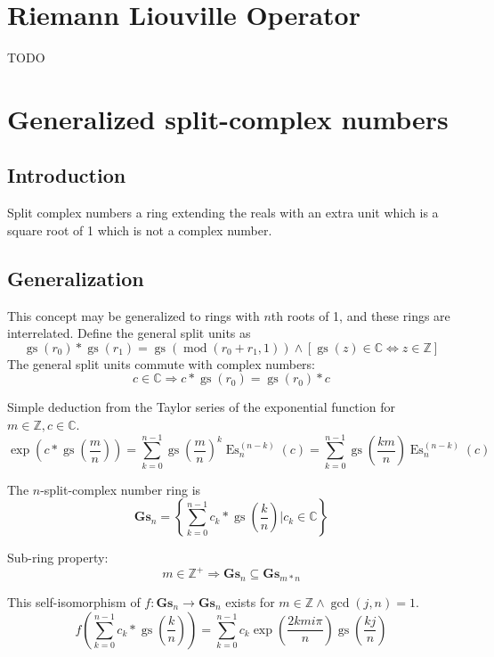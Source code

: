 \documentclass[]{article}
\DeclareMathOperator{\es}{Es}
\DeclareMathOperator{\gs}{gs}
\DeclareMathOperator{\md}{mod}
\newcommand{\pqty}[1]{{\left(#1\right)}}
\newcommand{\Bqty}[1]{{\left\{#1\right\}}}
\newcommand{\bqty}[1]{{\left[#1\right]}}
\begin{document}
	\section{Riemann Liouville Operator}
	TODO
	
	\section{Generalized split-complex numbers}
	\subsection{Introduction}
	Split complex numbers a ring extending the reals with an extra unit which is a square root of 1 which is not a complex number.
	\subsection{Generalization}
	This concept may be generalized to rings with $n$th roots of 1, and these rings are interrelated. Define the general split units as
	\begin{equation}
	\gs\pqty{r_0}*\gs\pqty{r_1}=\gs\pqty{\md\pqty{r_0+r_1,1}}
	\land
	\bqty{\gs\pqty{z}\in\mathbb{C}\Leftrightarrow z\in\mathbb{Z}}
	\end{equation}
	The general split units commute with complex numbers:
	\begin{equation}
	c\in\mathbb{C}\Rightarrow c*\gs\pqty{r_0}=\gs\pqty{r_0}*c
	\end{equation}
	
	Simple deduction from the Taylor series of the exponential function for $m\in\mathbb{Z}, c\in\mathbb{C}$.
	\begin{equation}
	\exp\pqty{c*\gs\pqty{\frac{m}{n}}}=\sum_{k=0}^{n-1}\gs\pqty{\frac{m}{n}}^k \es_n^{(n-k)}\pqty{c}
	=\sum_{k=0}^{n-1}\gs\pqty{\frac{km}{n}} \es_n^{(n-k)}\pqty{c}
	\end{equation}
	
	The $n$-split-complex number ring is
	\begin{equation}
	\mathbf{Gs}_n=\Bqty{\sum_{k=0}^{n-1} c_k*\gs\pqty{\frac{k}{n}} \Bigg\vert c_k\in\mathbb{C}}
	\end{equation}
	
	Sub-ring property:
	\begin{equation}
	m\in\mathbb{Z}^+\Rightarrow\mathbf{Gs}_n\subseteq\mathbf{Gs}_{m*n}
	\end{equation}
	
	This self-isomorphism of $f:\mathbf{Gs}_n\rightarrow\mathbf{Gs}_n$ exists for $m\in\mathbb{Z}\land\gcd\pqty{j,n}=1$.
	\begin{equation}
	f\pqty{\sum_{k=0}^{n-1} c_k*\gs\pqty{\frac{k}{n}}}=\sum_{k=0}^{n-1} c_k\exp\pqty{\frac{2kmi\pi}{n}}\gs\pqty{\frac{kj}{n}}
	\end{equation}
	
\end{document}
